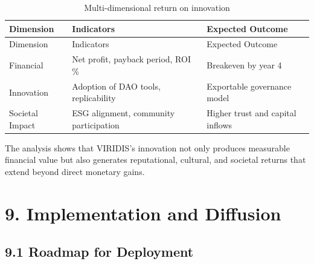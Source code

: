 \documentclass[
  english,
  12pt,
  oneside,
  open=any]{scrbook}
\begin{document}
\begin{longtable}[]{@{}
  >{\raggedright\arraybackslash}p{}
  >{\raggedright\arraybackslash}p{}
  >{\raggedright\arraybackslash}p{}@{}}
\caption{Multi-dimensional return on
innovation}\label{tbl-roi}\tabularnewline
\toprule\noalign{}
\begin{minipage}[b]{\linewidth}\raggedright
Dimension
\end{minipage} & \begin{minipage}[b]{\linewidth}\raggedright
Indicators
\end{minipage} & \begin{minipage}[b]{\linewidth}\raggedright
Expected Outcome
\end{minipage} \\
\midrule\noalign{}
\endfirsthead
\toprule\noalign{}
\begin{minipage}[b]{\linewidth}\raggedright
Dimension
\end{minipage} & \begin{minipage}[b]{\linewidth}\raggedright
Indicators
\end{minipage} & \begin{minipage}[b]{\linewidth}\raggedright
Expected Outcome
\end{minipage} \\
\midrule\noalign{}
\endhead
\bottomrule\noalign{}
\endlastfoot
Financial & Net profit, payback period, ROI \% & Breakeven by year 4 \\
Innovation & Adoption of DAO tools, replicability & Exportable
governance model \\
Societal Impact & ESG alignment, community participation & Higher trust
and capital inflows \\
\end{longtable}

The analysis shows that VIRIDIS's innovation not only produces
measurable financial value but also generates reputational, cultural,
and societal returns that extend beyond direct monetary gains.

\chapter{9. Implementation and Diffusion}\label{sec-implementation}

\section{9.1 Roadmap for Deployment}\label{sec-roadmap}
\end{document}

